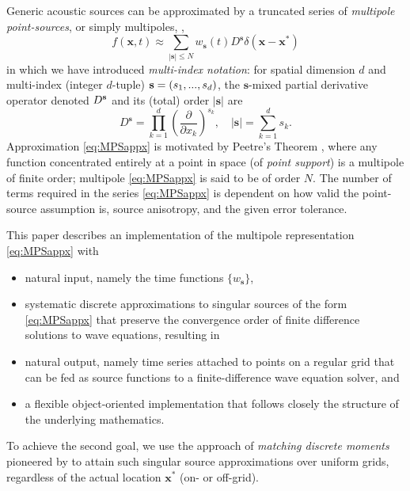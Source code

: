 Generic acoustic sources can be approximated by a truncated series of {\em multipole point-sources}, or simply multipoles, \cite[]{SantosaSymes:00},
\begin{equation}
\label{eq:MPSappx}
	f(\mathbf x,t) \approx \sum_{|\mathbf s|\le N} w_{\mathbf s}(t) D^{\mathbf s}\delta(\mathbf x-\mathbf x^*)
\end{equation}
in which we have introduced {\em multi-index notation}: for spatial dimension $d$ and multi-index (integer $d$-tuple) ${\bf s} = (s_1,...,s_d)$, the $\mathbf s$-mixed partial derivative operator denoted $D^{\bf s}$
and its (total) order $|\mathbf s|$ are
\begin{equation}\label{eq:PDO}
        D^{\mathbf s} = \prod_{k=1}^d \left( \frac{\partial}{\partial x_k}\right)^{s_k}, \quad |\mathbf s| = \sum_{k=1}^{d} s_k.
\end{equation}
Approximation \ref{eq:MPSappx} is motivated by Peetre's Theorem \cite[]{Horm:69}, where any function concentrated entirely at a point in space (of {\em point support}) is a multipole of finite order; multipole \ref{eq:MPSappx} is said to be of order $N$.
The number of terms required in the series \ref{eq:MPSappx} is dependent on how valid the point-source assumption is, source anisotropy, and the given error tolerance.


This paper describes an implementation of the multipole representation \ref{eq:MPSappx} with
\begin{itemize}
	\item natural input, namely the time functions $\{w_{\mathbf s}\}$, 
	\item systematic discrete approximations to singular sources of the form \ref{eq:MPSappx} that preserve the convergence order of finite difference solutions to wave equations, resulting in
	\item natural output, namely time series attached to points on a regular grid that can be fed as source functions to a finite-difference wave equation solver, and
	\item a flexible object-oriented implementation that follows closely the structure of the underlying mathematics.
\end{itemize}
To achieve the second goal, we use the approach of {\em matching discrete moments} pioneered by \cite{Walden:1999} to attain such singular source approximations over uniform grids, regardless of the actual location $\mathbf x^*$ (on- or off-grid). 

